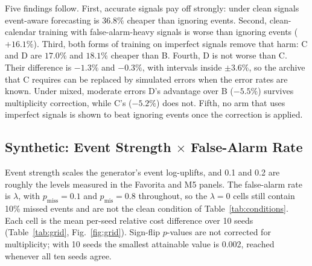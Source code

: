Five findings follow. First, accurate signals pay off strongly: under clean signals event-aware forecasting is $36.8\%$ cheaper than ignoring events. Second, clean-calendar training with false-alarm-heavy signals is worse than ignoring events ($+16.1\%$). Third, both forms of training on imperfect signals remove that harm: C and D are $17.0\%$ and $18.1\%$ cheaper than B. Fourth, D is not worse than C. Their difference is $-1.3\%$ and $-0.3\%$, with intervals inside $\pm 3.6\%$, so the archive that C requires can be replaced by simulated errors when the error rates are known. Under mixed, moderate errors D's advantage over B ($-5.5\%$) survives multiplicity correction, while C's ($-5.2\%$) does not. Fifth, no arm that uses imperfect signals is shown to beat ignoring events once the correction is applied.

\subsection{Synthetic: Event Strength $\times$ False-Alarm Rate}
Event strength scales the generator's event log-uplifts, and 0.1 and 0.2 are roughly the levels measured in the Favorita and M5 panels. The false-alarm rate is $\lambda$, with $p_{\text{miss}} = 0.1$ and $p_{\text{mis}} = 0.8$ throughout, so the $\lambda = 0$ cells still contain 10\% missed events and are not the clean condition of Table~\ref{tab:conditions}. Each cell is the mean per-seed relative cost difference over 10 seeds (Table~\ref{tab:grid}, Fig.~\ref{fig:grid}). Sign-flip $p$-values are not corrected for multiplicity; with 10 seeds the smallest attainable value is 0.002, reached whenever all ten seeds agree.

